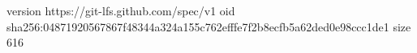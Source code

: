 version https://git-lfs.github.com/spec/v1
oid sha256:04871920567867f48344a324a155c762efffe7f2b8ecfb5a62ded0e98ccc1de1
size 616
